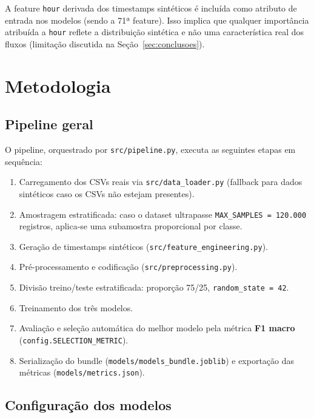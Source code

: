 \documentclass[12pt,a4paper]{article}
\begin{document}
A feature \texttt{hour} derivada dos timestamps sintéticos é incluída como
atributo de entrada nos modelos (sendo a 71ª feature). Isso implica que
qualquer importância atribuída a \texttt{hour} reflete a distribuição sintética
e não uma característica real dos fluxos (limitação discutida na
Seção~\ref{sec:conclusoes}).

\section{Metodologia}

\subsection{Pipeline geral}

O pipeline, orquestrado por \texttt{src/pipeline.py}, executa as seguintes
etapas em sequência:

\begin{enumerate}
  \item Carregamento dos CSVs reais via \texttt{src/data\_loader.py}
        (fallback para dados sintéticos caso os CSVs não estejam presentes).
  \item Amostragem estratificada: caso o dataset ultrapasse
        \texttt{MAX\_SAMPLES = 120.000} registros, aplica-se uma subamostra
        proporcional por classe.
  \item Geração de timestamps sintéticos (\texttt{src/feature\_engineering.py}).
  \item Pré-processamento e codificação (\texttt{src/preprocessing.py}).
  \item Divisão treino/teste estratificada: proporção 75/25,
        \texttt{random\_state = 42}.
  \item Treinamento dos três modelos.
  \item Avaliação e seleção automática do melhor modelo pela métrica
        \textbf{F1 macro} (\texttt{config.SELECTION\_METRIC}).
  \item Serialização do bundle (\texttt{models/models\_bundle.joblib}) e
        exportação das métricas (\texttt{models/metrics.json}).
\end{enumerate}

\subsection{Configuração dos modelos}
\end{document}
